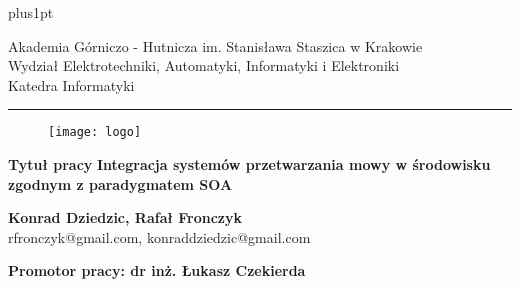 \documentclass[a4paper, twoside,11pt, openright]{Latex/Classes/PhDthesisPSnPDF}
\begin{document}
\def\tablename{Tabela}
\def\listtablename{Spis tabel}%


\renewcommand\baselinestretch{1.2}
\baselineskip=18pt plus1pt




\thispagestyle{empty}

\begin{center}
Akademia Górniczo - Hutnicza im. Stanisława Staszica w Krakowie \\
Wydział Elektrotechniki, Automatyki, Informatyki i Elektroniki \\
Katedra Informatyki
\rule{\textwidth}{.1mm}
\end{center}

\begin{figure}[hkp!]
 \centering
 \texttt{[image: logo]}
 \label{fig:orzel_agh}
\end{figure}

\begin{center}
{\bf \large Tytuł pracy}
\vskip 10pt
{\bf \Large Integracja systemów przetwarzania mowy w środowisku zgodnym z paradygmatem SOA}
\end{center}

\vskip 60pt
\begin{center}
{\Large \bf Konrad Dziedzic, Rafał Fronczyk}\\
{rfronczyk@gmail.com, konraddziedzic@gmail.com}
\end{center}

\vskip 50pt
\begin{center}
{\bf
    Promotor pracy: dr inż. Łukasz Czekierda
}
\end{center}
\end{document}
